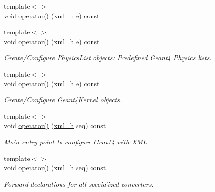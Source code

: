 \begin{DoxyCompactItemize}
{\footnotesize template$<$$>$ }\\void \hyperlink{struct_d_d4hep_1_1_converter_a0873996484226f4130077773aaf93aee}{operator()} (\hyperlink{_det_factory_helper_8h_ac13b3c79d2bc9214ff0cf5b8dc43dda6}{xml\+\_\+h} \hyperlink{_volumes_8cpp_a8a9a1f93e9b09afccaec215310e64142}{e}) const
\item 
{\footnotesize template$<$$>$ }\\void \hyperlink{struct_d_d4hep_1_1_converter_a65c74370f8ec91df41033e02429dc97f}{operator()} (\hyperlink{_det_factory_helper_8h_ac13b3c79d2bc9214ff0cf5b8dc43dda6}{xml\+\_\+h} \hyperlink{_volumes_8cpp_a8a9a1f93e9b09afccaec215310e64142}{e}) const
\begin{DoxyCompactList}\small\item\em Create/\+Configure Physics\+List objects\+: Predefined Geant4 Physics lists. \end{DoxyCompactList}\item 
{\footnotesize template$<$$>$ }\\void \hyperlink{struct_d_d4hep_1_1_converter_ace171104bb90ed3ee88c74b0109a5ddf}{operator()} (\hyperlink{_det_factory_helper_8h_ac13b3c79d2bc9214ff0cf5b8dc43dda6}{xml\+\_\+h} \hyperlink{_volumes_8cpp_a8a9a1f93e9b09afccaec215310e64142}{e}) const
\begin{DoxyCompactList}\small\item\em Create/\+Configure Geant4\+Kernel objects. \end{DoxyCompactList}\item 
{\footnotesize template$<$$>$ }\\void \hyperlink{struct_d_d4hep_1_1_converter_aa6390611e547e33c5ae48e33a26ec8e9}{operator()} (\hyperlink{_det_factory_helper_8h_ac13b3c79d2bc9214ff0cf5b8dc43dda6}{xml\+\_\+h} seq) const
\begin{DoxyCompactList}\small\item\em Main entry point to configure Geant4 with \hyperlink{namespace_d_d4hep_1_1_x_m_l}{X\+ML}. \end{DoxyCompactList}\item 
{\footnotesize template$<$$>$ }\\void \hyperlink{struct_d_d4hep_1_1_converter_a6a73f181b4731dbfc631ab16b9c40bae}{operator()} (\hyperlink{_det_factory_helper_8h_ac13b3c79d2bc9214ff0cf5b8dc43dda6}{xml\+\_\+h} seq) const
\begin{DoxyCompactList}\small\item\em Forward declarations for all specialized converters. \end{DoxyCompactList}\item 

\end{DoxyCompactItemize}
